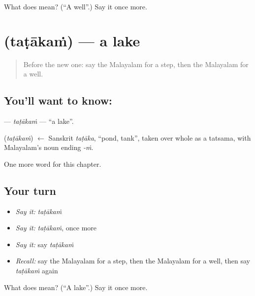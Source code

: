 \begin{tcolorbox}[breakable,colback=teal!4,colframe=teal!35!black,title={Before you move on}]
What does  mean? (\textquotedblleft{}A well\textquotedblright{}.) Say it once more.
\end{tcolorbox}
\section[\texorpdfstring{\ml{തടാകം} (taṭākaṁ)}{തടാകം (taṭākaṁ)}]{ (taṭākaṁ) — a lake}

\label{lesson:ML-C148-tatakam}



\begin{quote}
Before the new one: say the Malayalam for a step, then the Malayalam for a well.
\end{quote}

\subsection*{You'll want to know: }
\textbf{} — \emph{taṭākaṁ} — \textquotedblleft{}a lake\textquotedblright{}.

\begin{cousinweb}
\textbf{} (\emph{taṭākaṁ}) $\leftarrow$ Sanskrit \emph{taṭāka}, \textquotedblleft{}pond, tank\textquotedblright{}, taken over whole as a tatsama, with Malayalam's noun ending \emph{-ṁ}.
\end{cousinweb}

\begin{grammarlens}[title={What you've built}]
One more word for this chapter.
\end{grammarlens}

\subsection*{Your turn}
\begin{itemize}
\raggedright
  \item \emph{Say it:} \emph{taṭākaṁ}
  \item \emph{Say it:} \emph{taṭākaṁ}, once more
  \item \emph{Say it:} say \emph{taṭākaṁ}
  \item \emph{Recall:} say the Malayalam for a step, then the Malayalam for a well, then say \emph{taṭākaṁ} again
\end{itemize}

\begin{tcolorbox}[breakable,colback=teal!4,colframe=teal!35!black,title={Before you move on}]
What does  mean? (\textquotedblleft{}A lake\textquotedblright{}.) Say it once more.
\end{tcolorbox}
